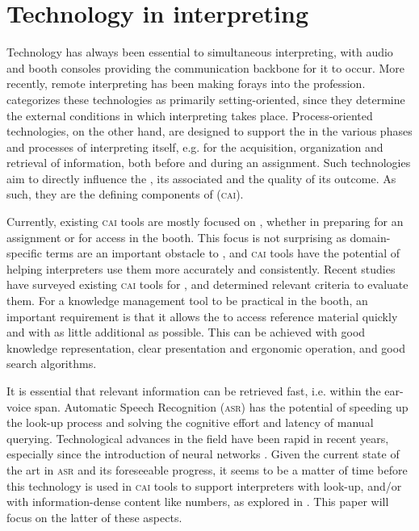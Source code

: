 \documentclass[output=paper]{langsci/langscibook}
\begin{document}
\section{Technology in interpreting}\largerpage[-1]

Technology has always been essential to simultaneous interpreting, with audio  and booth consoles providing the communication backbone for it to occur. More recently, remote interpreting has been making forays into the profession. \citet{Fantinuoli2018} categorizes these technologies as primarily setting-ori\-ented, since they determine the external conditions in which interpreting takes place. Process-oriented technologies, on the other hand, are designed to support the  in the various phases and processes of interpreting itself, e.g. for the acquisition, organization and retrieval of information, both before and during an assignment. Such technologies aim to directly influence the , its associated  and the quality of its outcome. As such, they are the defining components of  (\textsc{cai}).

Currently, existing \textsc{cai} tools are mostly focused on , whether in preparing for an assignment or for access in the booth. This focus is not surprising as domain-specific terms are an important obstacle to , and \textsc{cai} tools have the potential of helping interpreters use them more accurately and consistently. Recent studies \citep{Will2015,Fantinuoli2017a,Costa2018} have surveyed existing \textsc{cai} tools for , and determined relevant criteria to evaluate them. For a knowledge management tool to be practical in the booth, an important requirement is that it allows the  to access reference material quickly and with as little additional  as possible. This can be achieved with good knowledge representation, clear presentation and ergonomic operation, and good search algorithms.

It is essential that relevant information can be retrieved fast, i.e. within the ear-voice span. Automatic Speech Recognition (\textsc{asr}) has the potential of speeding up the look-up process and solving the cognitive effort and latency of manual querying. Technological advances in the field have been rapid in recent years, especially since the introduction of neural networks \citep{Yu2016}. Given the current state of the art in \textsc{asr} and its foreseeable progress, it seems to be a matter of time before this technology is used in \textsc{cai} tools to support interpreters with  look-up, and/or with information-dense content like numbers, as explored in \citet{Fantinuoli2017b}. This paper will focus on the latter of these aspects. 
\end{document}
